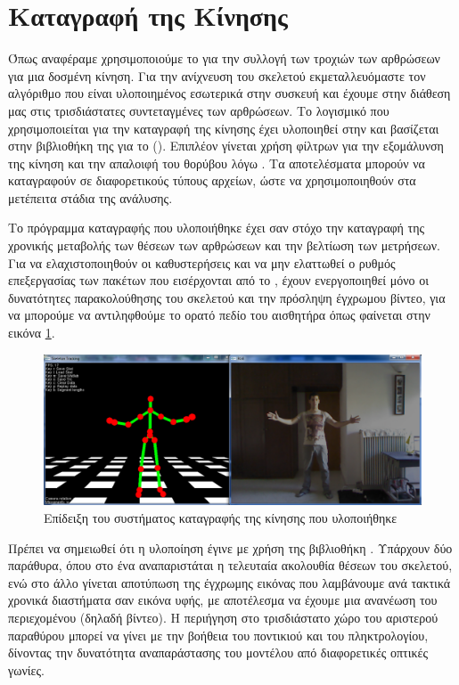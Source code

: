 \section{Καταγραφή της Κίνησης}

Όπως αναφέραμε χρησιμοποιούμε το  για την συλλογή των τροχιών των αρθρώσεων για μια δοσμένη κίνηση. Για την ανίχνευση του σκελετού εκμεταλλευόμαστε τον αλγόριθμο που είναι υλοποιημένος εσωτερικά στην συσκευή και έχουμε στην διάθεση μας στις τρισδιάστατες συντεταγμένες των αρθρώσεων. Το λογισμικό που χρησιμοποιείται για την καταγραφή της κίνησης έχει υλοποιηθεί στην  και βασίζεται στην βιβλιοθήκη της  για το  (). Επιπλέον γίνεται χρήση φίλτρων για την εξομάλυνση της κίνηση και την απαλοιφή του θορύβου λόγω . Τα αποτελέσματα μπορούν να καταγραφούν σε διαφορετικούς τύπους αρχείων, ώστε να χρησιμοποιηθούν στα μετέπειτα στάδια της ανάλυσης.

Το πρόγραμμα καταγραφής που υλοποιήθηκε έχει σαν στόχο την καταγραφή της χρονικής μεταβολής των θέσεων των αρθρώσεων και την βελτίωση των μετρήσεων. Για να ελαχιστοποιηθούν οι καθυστερήσεις και να μην ελαττωθεί ο ρυθμός επεξεργασίας των πακέτων που εισέρχονται από το , έχουν ενεργοποιηθεί μόνο οι δυνατότητες παρακολούθησης του σκελετού και την πρόσληψη έγχρωμου βίντεο, για να μπορούμε να αντιληφθούμε το ορατό πεδίο του αισθητήρα όπως φαίνεται στην εικόνα \ref{fig:motion-capture}.

\begin{figure}[H]
    \centering
    \includegraphics[width=.9\textwidth, keepaspectratio]{fig/motion-capture.png}
    \caption{Επίδειξη του συστήματος καταγραφής της κίνησης που υλοποιήθηκε}
    \label{fig:motion-capture}
\end{figure}

Πρέπει να σημειωθεί ότι η υλοποίηση έγινε με χρήση της βιβλιοθήκη . Υπάρχουν δύο παράθυρα, όπου στο ένα αναπαριστάται η τελευταία ακολουθία θέσεων του σκελετού, ενώ στο άλλο γίνεται αποτύπωση της έγχρωμης εικόνας που λαμβάνουμε ανά τακτικά χρονικά διαστήματα σαν εικόνα υφής, με αποτέλεσμα να έχουμε μια ανανέωση του περιεχομένου (δηλαδή βίντεο). Η περιήγηση στο τρισδιάστατο χώρο του αριστερού παραθύρου μπορεί να γίνει με την βοήθεια του ποντικιού και του πληκτρολογίου, δίνοντας την δυνατότητα αναπαράστασης του μοντέλου από διαφορετικές οπτικές γωνίες.

